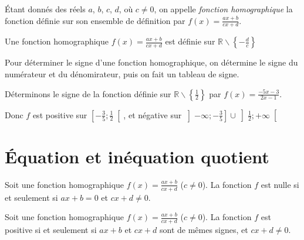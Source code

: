 \begin{definition}
  Étant donnés des réels $a$, $b$, $c$, $d$, où $c\neq0$, on appelle \emph{fonction homographique} la fonction définie sur son ensemble de définition par $f(x)=\frac{ax+b}{cx+d}$.
\end{definition}

\begin{propriete}
  Une fonction homographique $f(x)=\frac{ax+b}{cx+d}$ est définie sur $\mathbb{R}\backslash\left\{-\frac{d}{c}\right\}$
\end{propriete}

\begin{methode}
  Pour déterminer le signe d'une fonction homographique, on détermine le signe du numérateur et du dénomirateur, puis on fait un tableau de signe.
\end{methode}
\begin{exemple}
  Déterminons le signe de la fonction définie sur
  $\mathbb{R}\backslash\left\{\frac{1}{2}\right\}$ par
  $f(x)=\frac{-5x-3}{2x-1}$.

  \begin{center}
\end{center}
Donc $f$ est positive sur $\left[-\frac{3}{5};\frac{1}{2}\right[$, et négative sur $\left]-\infty; -\frac{3}{5}\right]\cup\left]\frac{1}{2};+\infty\right[$
\end{exemple}

\section{Équation et inéquation quotient}

\begin{propriete}
  Soit une fonction homographique $f(x)=\frac{ax+b}{cx+d}$ ($c\neq0$). La fonction $f$ est nulle si et seulement si $ax+b=0$ et $cx+d\neq0$.
\end{propriete}

\begin{propriete}
  Soit une fonction homographique $f(x)=\frac{ax+b}{cx+d}$ ($c\neq0$). La fonction $f$ est positive si et seulement si $ax+b$ et $cx+d$ sont de mêmes signes, et $cx+d\neq0$.
\end{propriete}
